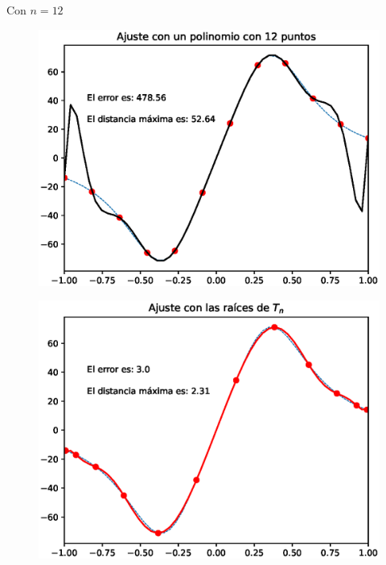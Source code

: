\documentclass[12pt]{article}
\numberwithin{equation}{section}
\begin{document}
Con $n = 12$
\\
\begin{minipage}{0.45\linewidth}
    \begin{figure}[H]
    \centering
    \includegraphics[scale=0.44]{Imagenes/Interpolacion_Chebychev_12_Polinomio.eps}
    \end{figure}       
\end{minipage}
\hspace{0.1cm}
\begin{minipage}{0.45\linewidth}
\begin{figure}[H]
    \centering
    \includegraphics[scale=0.44]{Imagenes/Interpolacion_Chebychev_12_Raices.eps}
\end{figure}
\end{minipage}
\end{document}
